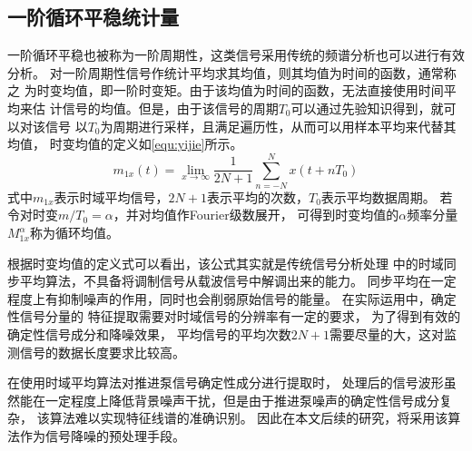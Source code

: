 \subsection{一阶循环平稳统计量}
一阶循环平稳也被称为一阶周期性，这类信号采用传统的频谱分析也可以进行有效分析。
对一阶周期性信号作统计平均求其均值，则其均值为时间的函数，通常称之
为时变均值，即一阶时变矩。由于该均值为时间的函数，无法直接使用时间平均来估
计信号的均值\cite{zhou2006}。但是，由于该信号的周期$T_{0}$可以通过先验知识得到，就可以对该信号
以$T_{0}$为周期进行采样，且满足遍历性，从而可以用样本平均来代替其均值，
时变均值的定义如\autoref{equ:yijie}所示。
\begin{equation}
    \label{equ:yijie}
    m_{1x} \left ( t \right ) =\lim_{x \to \infty} \frac{1}{2N+1}\sum_{n=-N}^{N}x\left ( t+nT_{0}  \right )   
\end{equation}
式中$m_{1x}$表示时域平均信号，$2N+1$表示平均的次数，$T_{0}$表示平均数据周期。
若令对时变$m/T_{0} =\alpha$，并对均值作Fourier级数展开，
可得到时变均值的$\alpha$频率分量$M_{1x}^{\alpha}$称为循环均值。

根据时变均值的定义式可以看出，该公式其实就是传统信号分析处理
中的时域同步平均算法，不具备将调制信号从载波信号中解调出来的能力\cite{zhou2006}。
同步平均在一定程度上有抑制噪声的作用，同时也会削弱原始信号的能量。
在实际运用中，确定性信号分量的
特征提取需要对时域信号的分辨率有一定的要求，
为了得到有效的确定性信号成分和降噪效果，
平均信号的平均次数$2N+1$需要尽量的大，这对监测信号的数据长度要求比较高\cite{陈进2013机械故障特征提取的循环平稳理论及方法}。

在使用时域平均算法对推进泵信号确定性成分进行提取时，
处理后的信号波形虽然能在一定程度上降低背景噪声干扰，但是由于推进泵噪声的确定性信号成分复杂，
该算法难以实现特征线谱的准确识别。
因此在本文后续的研究，将采用该算法作为信号降噪的预处理手段。


